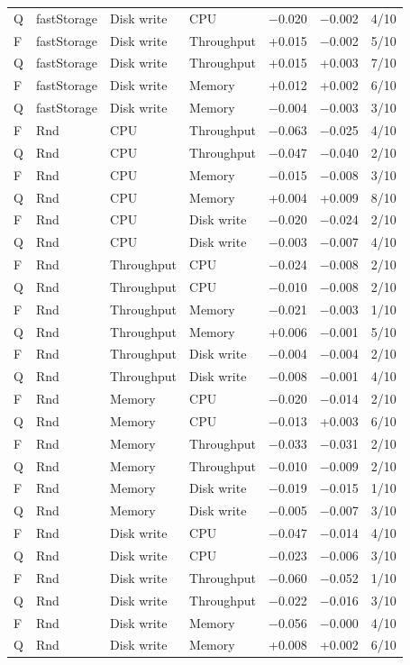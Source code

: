 \documentclass[a4paper,11pt]{article}
\begin{document}
\begin{longtable}{@{}llllrrr@{}}
Q & fastStorage & Disk write & CPU & $-$0.020 & $-$0.002 & 4/10 \\
F & fastStorage & Disk write & Throughput & +0.015 & $-$0.002 & 5/10 \\
Q & fastStorage & Disk write & Throughput & +0.015 & +0.003 & 7/10 \\
F & fastStorage & Disk write & Memory & +0.012 & +0.002 & 6/10 \\
Q & fastStorage & Disk write & Memory & $-$0.004 & $-$0.003 & 3/10 \\
F & Rnd & CPU & Throughput & $-$0.063 & $-$0.025 & 4/10 \\
Q & Rnd & CPU & Throughput & $-$0.047 & $-$0.040 & 2/10 \\
F & Rnd & CPU & Memory & $-$0.015 & $-$0.008 & 3/10 \\
Q & Rnd & CPU & Memory & +0.004 & +0.009 & 8/10 \\
F & Rnd & CPU & Disk write & $-$0.020 & $-$0.024 & 2/10 \\
Q & Rnd & CPU & Disk write & $-$0.003 & $-$0.007 & 4/10 \\
F & Rnd & Throughput & CPU & $-$0.024 & $-$0.008 & 2/10 \\
Q & Rnd & Throughput & CPU & $-$0.010 & $-$0.008 & 2/10 \\
F & Rnd & Throughput & Memory & $-$0.021 & $-$0.003 & 1/10 \\
Q & Rnd & Throughput & Memory & +0.006 & $-$0.001 & 5/10 \\
F & Rnd & Throughput & Disk write & $-$0.004 & $-$0.004 & 2/10 \\
Q & Rnd & Throughput & Disk write & $-$0.008 & $-$0.001 & 4/10 \\
F & Rnd & Memory & CPU & $-$0.020 & $-$0.014 & 2/10 \\
Q & Rnd & Memory & CPU & $-$0.013 & +0.003 & 6/10 \\
F & Rnd & Memory & Throughput & $-$0.033 & $-$0.031 & 2/10 \\
Q & Rnd & Memory & Throughput & $-$0.010 & $-$0.009 & 2/10 \\
F & Rnd & Memory & Disk write & $-$0.019 & $-$0.015 & 1/10 \\
Q & Rnd & Memory & Disk write & $-$0.005 & $-$0.007 & 3/10 \\
F & Rnd & Disk write & CPU & $-$0.047 & $-$0.014 & 4/10 \\
Q & Rnd & Disk write & CPU & $-$0.023 & $-$0.006 & 3/10 \\
F & Rnd & Disk write & Throughput & $-$0.060 & $-$0.052 & 1/10 \\
Q & Rnd & Disk write & Throughput & $-$0.022 & $-$0.016 & 3/10 \\
F & Rnd & Disk write & Memory & $-$0.056 & $-$0.000 & 4/10 \\
Q & Rnd & Disk write & Memory & +0.008 & +0.002 & 6/10 \\
\end{longtable}
\normalsize\setlength{\tabcolsep}{4pt}
\end{document}
